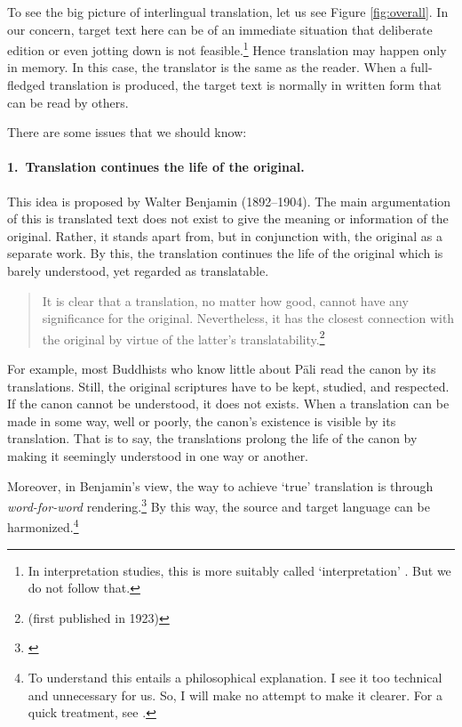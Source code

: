 To see the big picture of interlingual translation, let us see Figure \ref{fig:overall}. In our concern, target text here can be of an immediate situation that deliberate edition or even jotting down is not feasible.\footnote{In interpretation studies, this is more suitably called `interpretation' \citep[see][pp.~10--1]{pochhacker:interpreting}. But we do not follow that.} Hence translation may happen only in memory. In this case, the translator is the same as the reader. When a full-fledged translation is produced, the target text is normally in written form that can be read by others.

There are some issues that we should know:

\paragraph*{1.\ Translation continues the life of the original.} This idea is proposed by Walter Benjamin (1892--1904). The main argumentation of this is translated text does not exist to give the meaning or information of the original. Rather, it stands apart from, but in conjunction with, the original as a separate work. By this, the translation continues the life of the original which is barely understood, yet regarded as translatable. 

\begin{quote}
It is clear that a translation, no matter how good, cannot have any significance for the original. Nevertheless, it has the closest connection with the original by virtue of the latter's translatability.\footnote{\citealp[p.~76]{benjamin:task} (first published in 1923)}
\end{quote}

For example, most Buddhists who know little about P\=ali read the canon by its translations. Still, the original scriptures have to be kept, studied, and respected. If the canon cannot be understood, it does not exists. When a translation can be made in some way, well or poorly, the canon's existence is visible by its translation. That is to say, the translations prolong the life of the canon by making it seemingly understood in one way or another.

Moreover, in Benjamin's view, the way to achieve `true' translation is through \emph{word-for-word} rendering.\footnote{\citealp[p.~81]{benjamin:task}} By this way, the source and target language can be harmonized.\footnote{To understand this entails a philosophical explanation. I see it too technical and unnecessary for us. So, I will make no attempt to make it clearer. For a quick treatment, see \citealp[pp.~260--4]{munday:translation}.}

